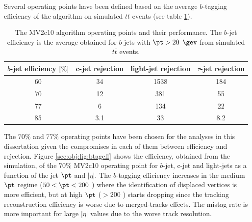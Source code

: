 Several operating points have been defined based on the average $b$-tagging efficiency of the algorithm on simulated $t\bar{t}$ events (see table \ref{tab:obj:jet:btag}). 
\begin{table}\footnotesize
\begin{center}
\begin{tabular}{|c|c|c|c|}
  \hline \hline
   $b$-jet efficiency [$\%$] & c-jet rejection & light-jet rejection & $\tau$-jet rejection \\
  \hline
  60 & 34 & 1538 & 184\\
  \hline
  70 & 12 & 381 & 55\\
  \hline
  77&6&134&22\\
  \hline
  85&3.1&33&8.2\\
 \hline \hline
\end{tabular}
\captionsetup{width=0.85\textwidth} \caption{\small The MV2c10 algorithm operating points and their performance. The $b$-jet efficiency is the average obtained for $b$-jets with $\pt>20$ $\gev$ from simulated $t\bar{t}$ events.}
\label{tab:obj:jet:btag}
\end{center}
\end{table}
The $70\%$ and $77\%$ operating points have been chosen for the analyses in this dissertation given the compromises in each of them between efficiency and rejection. Figure \ref{sec:obj:fig:btageff} shows the efficiency, obtained from the simulation, of the $70\%$ MV2c10 operating point for $b$-jet, c-jet and light-jets as a function of the jet $\pt$ and $|\eta|$. The $b$-tagging efficiency increases in the medium $\pt$ regime ($50<\pt<200$ \gev) where the identification of displaced vertices is more efficient, but at high $\pt$ ($>200$ \gev) starts dropping since the tracking reconstruction efficiency is worse due to merged-tracks effects. The mistag rate is more important for large $|\eta|$ values due to the worse track resolution.


